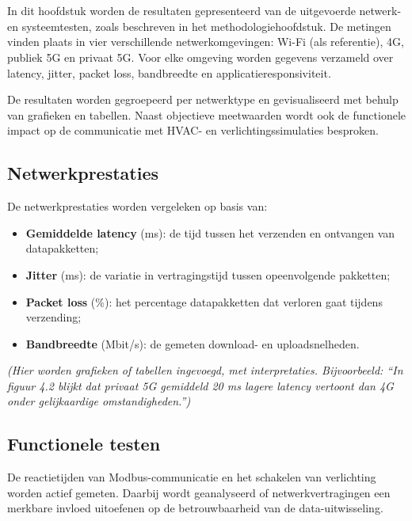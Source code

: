 \chapter{}%
\label{ch:resultaten}

In dit hoofdstuk worden de resultaten gepresenteerd van de uitgevoerde netwerk- en systeemtesten, zoals beschreven in het methodologiehoofdstuk. De metingen vinden plaats in vier verschillende netwerkomgevingen: Wi-Fi (als referentie), 4G, publiek 5G en privaat 5G. Voor elke omgeving worden gegevens verzameld over latency, jitter, packet loss, bandbreedte en applicatieresponsiviteit.

De resultaten worden gegroepeerd per netwerktype en gevisualiseerd met behulp van grafieken en tabellen. Naast objectieve meetwaarden wordt ook de functionele impact op de communicatie met HVAC- en verlichtingssimulaties besproken.

\section{Netwerkprestaties}

De netwerkprestaties worden vergeleken op basis van:

\begin{itemize}
    \item \textbf{Gemiddelde latency} (ms): de tijd tussen het verzenden en ontvangen van datapakketten;
    \item \textbf{Jitter} (ms): de variatie in vertragingstijd tussen opeenvolgende pakketten;
    \item \textbf{Packet loss} (\%): het percentage datapakketten dat verloren gaat tijdens verzending;
    \item \textbf{Bandbreedte} (Mbit/s): de gemeten download- en uploadsnelheden.
\end{itemize}

\textit{(Hier worden grafieken of tabellen ingevoegd, met interpretaties. Bijvoorbeeld: “In figuur 4.2 blijkt dat privaat 5G gemiddeld 20 ms lagere latency vertoont dan 4G onder gelijkaardige omstandigheden.”)}

\section{Functionele testen}

De reactietijden van Modbus-communicatie en het schakelen van verlichting worden actief gemeten. Daarbij wordt geanalyseerd of netwerkvertragingen een merkbare invloed uitoefenen op de betrouwbaarheid van de data-uitwisseling.

